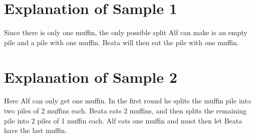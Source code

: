 \section*{Explanation of Sample 1}
Since there is only one muffin, the only possible split Alf can make is an empty pile and a pile with one muffin. Beata will then eat the pile with one muffin. 

\section*{Explanation of Sample 2}
Here Alf can only get one muffin. In the first round he splits the muffin pile into two piles of 2 muffins each. Beata eats 2 muffins, and then splits the remaining pile into 2 piles of 1 muffin each. Alf eats one muffin and must then let Beata have the last muffin.
